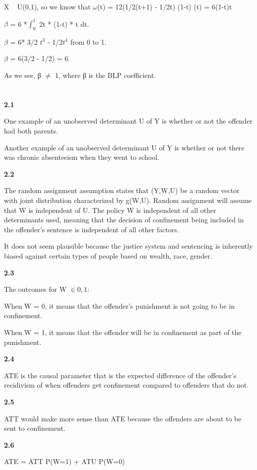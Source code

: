 X ~ U(0,1), so we know that $\omega$(t) =
12(1/2(t+1) - 1/2t) (1-t) (t) = 6(1-t)t

$\beta$ = 6 *$\int_{0}^{1}$ 2t * (1-t) * t dt.

$\beta$ = 6* 3/2 $t^{3}$ - 1/2$t^{4}$ from 0 to 1.

$\beta$ = 6(3/2 - 1/2) = 6.

As we see, β $\neq$ 1, where β is the BLP coefficient.

\section{}

\textbf{2.1}

One example of an unobserved determinant U of Y is whether or not the offender had both parents.

Another example of an unobserved determinant U of Y is whether or not there was chronic absenteeism when they went to school.

\textbf{2.2}

The random assignment assumption states that (Y,W,U) be a random vector with joint distribution characterized by g(W,U). Random assignment will assume that W is independent of U. The policy W is independent of all other determinants used, meaning that the decision of confinement being included in the offender's sentence is independent of all other factors.

It does not seem plausible because the justice system and sentencing is inherently biased against certain types of people based on wealth, race, gender.

\textbf{2.3}

The outcomes for W $\in{0,1}$:

When W = 0, it means that the offender's punishment is not going to be in confinement.

When W = 1, it means that the offender will be in confinement as part of the punishment.

\textbf{2.4}

ATE is the causal parameter that is the expected difference of the offender's recidivism of when offenders get confinement compared to offenders that do not.

\textbf{2.5}

ATT would make more sense than ATE because the offenders are about to be sent to confinement.

\textbf{2.6}

ATE = ATT P(W=1) + ATU P(W=0)

